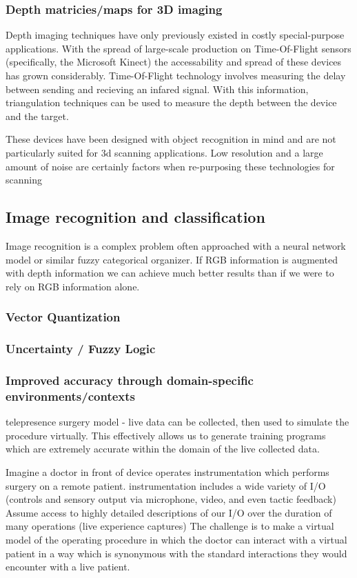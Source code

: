 \documentclass[final,a4paper,12pt]{report}
\begin{document}
\cite{5397590}
\subsubsection{Depth matricies/maps for 3D imaging}
Depth imaging techniques have only previously existed in costly special-purpose applications. With the spread of large-scale production on Time-Of-Flight sensors (specifically, the Microsoft Kinect) the accessability and spread of these devices has grown considerably. Time-Of-Flight technology involves measuring the delay between sending and recieving an infared signal. With this information, triangulation techniques can be used to measure the depth between the device and the target. 

These devices have been designed with object recognition in mind and are not particularly suited for 3d scanning applications. Low resolution and a large amount of noise are certainly factors when re-purposing these technologies for scanning\cite{6296662} 
\subsection{Image recognition and classification}
Image recognition is a complex problem often approached with a neural network model or similar fuzzy categorical organizer. If RGB information is augmented with depth information we can achieve much better results than if we were to rely on RGB information alone.
\subsubsection{Vector Quantization}
\subsubsection{Uncertainty / Fuzzy Logic}
\subsubsection{Improved accuracy through domain-specific environments/contexts}
telepresence surgery model - live data can be collected, then used to simulate the procedure virtually. 
This effectively allows us to generate training programs which are extremely accurate within the domain of the live collected data.

Imagine a doctor in front of device operates instrumentation which performs surgery on a remote patient.
instrumentation includes a wide variety of I/O (controls and sensory output via microphone, video, and even tactic feedback)
Assume access to highly detailed descriptions of our I/O over the duration of many operations (live experience captures)
The challenge is to make a virtual model of the operating procedure in which the doctor can interact with a virtual patient in a way which is synonymous with the standard interactions they would encounter with a live patient.
\end{document}
